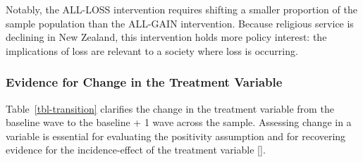 \documentclass[
  singlecolumn]{article}
\begin{document}
Notably, the ALL-LOSS intervention requires shifting a smaller
proportion of the sample population than the ALL-GAIN intervention.
Because religious service is declining in New Zealand, this intervention
holds more policy interest: the implications of loss are relevant to a
society where loss is occurring.

\subsubsection{Evidence for Change in the Treatment
Variable}\label{evidence-for-change-in-the-treatment-variable}

Table~\ref{tbl-transition} clarifies the change in the treatment
variable from the baseline wave to the baseline + 1 wave across the
sample. Assessing change in a variable is essential for evaluating the
positivity assumption and for recovering evidence for the
incidence-effect of the treatment variable {[}{]}.

\begin{table}

\caption{\label{tbl-placeholder}}

\centering{

\captionsetup{labelsep=none}

}

\end{table}%
\end{document}
